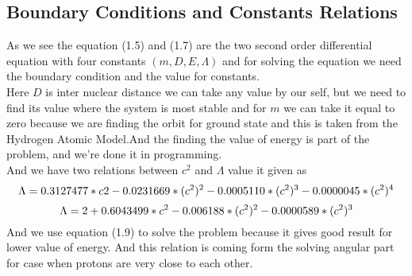 \documentclass[12pt]{report}
\begin{document}
	\subsection{Boundary Conditions and Constants Relations}
		\boldmath \normalsize As we see the equation (1.5) and (1.7) are the two second order differential equation with four constants $(m,D,E,\Lambda)$ and for solving the equation we need the boundary condition and the value for constants. \\
		\boldmath \normalsize Here $D$ is inter nuclear distance we can take any value by our self, but we need to find its value where the system is most stable and for $m$ we can take it equal to zero because we are finding the orbit for ground state and this is taken from the Hydrogen Atomic Model.And the finding the value of energy is part of the problem, and we're done it in programming. \\
		\boldmath \normalsize And we have two relations between $c^{2} $ and $\Lambda$ value it given as 
		\begin{equation}
			\normalsize \boldmath
			\Lambda = 0.3127477*c2 - 0.0231669*(c^2)^2 - 0.0005110*(c^2)^3 - 0.0000045*(c^2)^4
		\end{equation}
		\begin{equation}
			\normalsize \boldmath
			\Lambda = 2 + 0.6043499*c^2 - 0.006188*(c^2)^2 - 0.0000589*(c^2)^3
		\end{equation}
		\normalsize And we use equation (1.9) to solve the problem because it gives good result for lower value of energy. And this relation is coming form the solving  angular part for case when protons are very close to each other.\\
\end{document}
